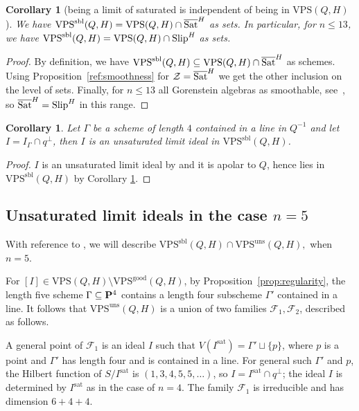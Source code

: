 \documentclass{amsart}
\newcommand{\Slip}{{\rm{Slip}}}
\newcommand{\Satbar}{\overline{\rm{Sat}}}
\newcommand{\PP}{{\bf P}}
\newcommand{\VPSsbl}{{\mathrm{VPS}}^{\mathrm{sbl}}(Q, H)}
\newcommand{\VPSuns}{{\mathrm{VPS}}^{\mathrm{uns}}(Q, H)}
\newcommand{\VPSgood}{{\mathrm{VPS}}^{\mathrm{good}}(Q, H)}
\newcommand{\VPS}{\mathrm{VPS}(Q, H)}
\newcommand{\sat}{\mathrm{sat}}%
\newtheorem{corollary}[lemma]{\bf Corollary}
\begin{document}
\begin{corollary}[being a limit of saturated is independent of being in $\VPS$]\label{ref:saturableAndApolarImpliesSaturableInApolar:cor}
    We have $\VPSsbl = \VPS \cap \Satbar^H$ as sets. In particular, for $n\leq
    13$, we have $\VPSsbl = \VPS \cap \Slip^H$ as sets.
\end{corollary}
\begin{proof}
    By definition, we have $\VPSsbl \subseteq \VPS \cap \Satbar^H$ as schemes.
    Using Proposition~\ref{ref:smoothness} for $\mathcal{Z} = \Satbar^H$ we get the other inclusion on the level of sets.
    Finally, for $n\leq 13$ all Gorenstein algebras as smoothable,
    see~\cite{cjn13}, so $\Satbar^H = \Slip^H$ in this range.
\end{proof}
\begin{corollary}\label{unsaturatedlimits4}
Let $\Gamma$ be a scheme of length $4$ contained in a line in $Q^{-1}$ and let $I=I_\Gamma\cap q^\perp$, then $I$ is an unsaturated limit ideal in $\VPSsbl$.
\end{corollary}
\begin{proof} $I$ is an unsaturated limit ideal by \cite[Proposition 4.2]{JM} and it is apolar to $Q$, hence lies in $\VPSsbl$ by Corollary \ref{ref:saturableAndApolarImpliesSaturableInApolar:cor}.
\end{proof}
\subsection{Unsaturated limit ideals in the case $n=5$}

With reference to \cite[\S4.4.2 and \S4.4.3]{JM}, we will describe $\VPSsbl\cap \VPSuns,$ when $n=5$.

For $[I]\in \VPS
\setminus \VPSgood$, by Proposition~\ref{prop:regularity}, the
length five scheme $\Gamma \subseteq \PP^4$ contains a length four subscheme
$\Gamma'$ contained in a line.
It follows that $\VPSuns$ is a union of two families $\mathcal{F}_1,
\mathcal{F}_{2}$, described as follows.

A general point of $\mathcal{F}_1$ is an
ideal $I$ such that $V(I^{\sat}) = \Gamma' \sqcup \{p\}$, where $p$ is a point
and $\Gamma'$ has length four and is contained in a line. For general such
$\Gamma'$ and $p$, the Hilbert function of $S/I^{\sat}$ is $(1,3,4,5,5,
\ldots)$, so $I = I^{\sat} \cap q^\perp$; the ideal $I$ is determined by
$I^{\sat}$ as in the case of $n=4$. The family $\mathcal{F}_1$ is irreducible and has dimension
$6+4+4$.
\end{document}
